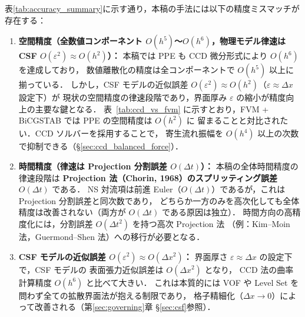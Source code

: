 \begin{tcolorbox}[warnbox, title={精度ミスマッチと設計上のトレードオフ}]
表\ref{tab:accuracy_summary}に示す通り，本稿の手法には以下の精度ミスマッチが存在する：

\begin{enumerate}
  \item \textbf{空間精度（全数値コンポーネント $O(h^5)$～$O(h^6)$，物理モデル律速は CSF $O(\varepsilon^2){\approx}O(h^2)$）：}
        本稿では PPE も CCD 微分形式により $O(h^6)$ を達成しており，
        数値離散化の精度は全コンポーネントで $O(h^5)$ 以上に揃っている．
        しかし，CSF モデルの近似誤差 $O(\varepsilon^2) \approx O(h^2)$（$\varepsilon \approx \Delta x$ 設定下）が
        現状の空間精度の律速段階であり，界面厚み $\varepsilon$ の縮小が精度向上の主要な鍵となる．
        表~\ref{tab:ccd_vs_fvm} に示すとおり，FVM + BiCGSTAB では PPE の空間精度は $O(h^2)$ に
        留まることと対比されたい．CCD ソルバーを採用することで，
        寄生流れ振幅を $O(h^4)$ 以上の次数で抑制できる（§\ref{sec:ccd_balanced_force}）．

  \item \textbf{時間精度（律速は Projection 分割誤差 $O(\Delta t)$）：}
        本稿の全体時間精度の律速段階は \textbf{Projection 法（Chorin, 1968）のスプリッティング誤差 $O(\Delta t)$} である．
        NS 対流項は前進 Euler（$O(\Delta t)$）であるが，これは Projection 分割誤差と同次数であり，
        どちらか一方のみを高次化しても全体精度は改善されない（両方が $O(\Delta t)$ である原因は独立）．
        時間方向の高精度化には，分割誤差 $O(\Delta t^2)$ を持つ高次 Projection 法
        （例：Kim--Moin 法，Guermond--Shen 法）への移行が必要となる．

  \item \textbf{CSF モデルの近似誤差 $O(\varepsilon^2) \approx O(\Delta x^2)$：}
        界面厚さ $\varepsilon \approx \Delta x$ の設定下で，CSF モデルの
        表面張力近似誤差は $O(\Delta x^2)$ となり，
        CCD 法の曲率計算精度 $O(h^6)$ と比べて大きい．
        これは本質的には VOF や Level Set を問わず全ての拡散界面法が抱える制限であり，
        格子精細化（$\Delta x \to 0$）によって改善される（第\ref{sec:governing}章 §\ref{sec:csf}参照）．
\end{enumerate}
\end{tcolorbox}


